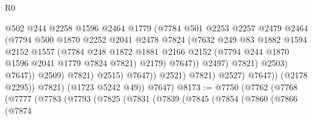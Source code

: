\begin{lexlean}{R0}
\begin{coremodule}
                                        @502
                                        @244
                                        @2258
                                        @1596
                                        @2464
                                        @1779
                                        (@7784
                                          @501
                                          @2253
                                          @2257
                                          @2479
                                          @2464
                                          (@7794
                                            @500
                                            @1870
                                            @2252
                                            @2041
                                            @2478
                                            @7824
                                            (@7632
                                              @249
                                              @83
                                              @1882
                                              @1594
                                              @2152
                                              @1557
                                              (@7784
                                                @248
                                                @1872
                                                @1881
                                                @2166
                                                @2152
                                                (@7794 @244 @1870 @1596 @2041 @1779 @7824 @7821)
                                                @2179)
                                              @7647))
                                          @2497)
                                        @7821)
                                      @2503)
                                    @7647))
                                @2509)
                              @7821)
                            @2515)
                          @7647))
                      @2521)
                    @7821)
                  @2527)
                @7647))
            (@2178 @2295))
          @7821)
        (@1723 @5242 @49))
      @7647)
@8173 := @7750
    (@7762
      (@7768
        (@7777
          (@7783
            (@7793
              (@7825
                (@7831
                  (@7839
                    (@7845
                      (@7854
                        (@7860
                          (@7866
                            (@7874

\end{coremodule}
\end{lexlean}

